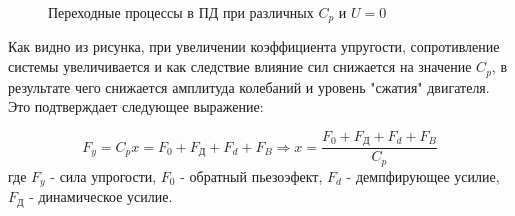 \documentclass[a4paper, 12pt]{article}
\begin{document}
\begin{figure}[h!]
    \begin{subfigure}{\textwidth}
        \centering
    \end{subfigure}
    \vspace{0.5cm}
    \caption{Переходные процессы в ПД при различных $C_p$ и $U = 0$}
\end{figure} \par

Как видно из рисунка, при увеличении коэффициента упругости, сопротивление системы увеличивается и как следствие влияние сил снижается на значение $C_p$, в результате чего снижается амплитуда колебаний и уровень "сжатия" двигателя. Это подтверждает следующее выражение:

\begin{equation*}
   F_y = C_px = F_0 + F_\text{Д} + F_d + F_B \Rightarrow x = \frac{F_0 + F_\text{Д} + F_d + F_B}{C_p}
\end{equation*}
где $F_y$ - сила упрогости, $F_0$ - обратный пьезоэфект, $F_d$ - демпфирующее усилие, $F_\text{Д}$ - динамическое усилие.
\end{document}
